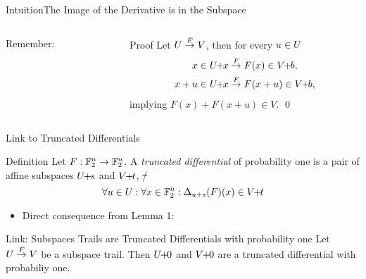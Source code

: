 \begin{frame}{Intuition}{The Image of the Derivative is in the Subspace}
\begin{columns}[t,onlytextwidth]
\begin{column}{0.45\textwidth}
\begin{block}{Remember:}
            \end{block}
        \end{column}
        \begin{column}{0.45\textwidth}
            \begin{block}{Proof}
                \vspace{0.5em}
                Let $U \stackrel{F}{\rightarrow} V$, then for every $u \in U$
                \begin{align*}
                    x \in \coset{U}{x} &\through{F} F(x) \in \coset{V}{b}, \\
                    x+u \in \coset{U}{x} &\through{F} F(x+u) \in \coset{V}{b},
                \end{align*}
                implying $F(x) + F(x + u) \in V$.
                \qed{}
                \vspace{0.5em}
            \end{block}
        \end{column}
    \end{columns}
\end{frame}

\begin{frame}{Link to Truncated Differentials}
    \begin{block}{Definition}
        Let $F : \mathbb{F}_2^n \to \mathbb{F}_2^n$.
        A \emph{truncated differential} of probability one is a pair of affine subspaces $U \!\! + \!\! s$ and $V \!\! + \!\! t$, \st/
        \begin{equation*}
            \forall u \in U : \forall x \in \mathbb{F}_2^n : \Delta_{u + s}(F)(x) \in V \!\! + \!\! t
        \end{equation*}
    \end{block}
    \begin{itemize}
        \item Direct consequence from Lemma 1:
    \end{itemize}
    \begin{block}{Link: Subspaces Trails are Truncated Differentials with probability one}
        \vspace{0.5em}
        Let $U \stackrel{F}{\rightarrow} V$ be a subspace trail.
        Then $U \!\! + \!\! 0$ and $V \!\! + \!\! 0$ are a truncated differential with probabiliy one.
        \vspace{0.5em}
    \end{block}
\end{frame}

